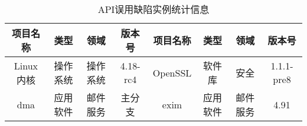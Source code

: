 \begin{table}[b]
	\centering
	\begin{minipage}[t]{\linewidth} %
		\caption{API误用缺陷实例统计信息}
		\label{tab:4-4-target}
		\begin{tabular}{cccccccc}
			\hline
			项目名称 & 类型 & 领域 & 版本号 & 项目名称 & 类型 & 领域 & 版本号\\
			\hline
			Linux内核 & 操作系统 & 操作系统 & 4.18-rc4 & OpenSSL & 软件库 & 安全 & 1.1.1-pre8\\
			dma & 应用软件 & 邮件服务 & 主分支 & exim & 应用软件 & 邮件服务 & 4.91 \\
			\hline
		\end{tabular}
	\end{minipage}
\end{table}